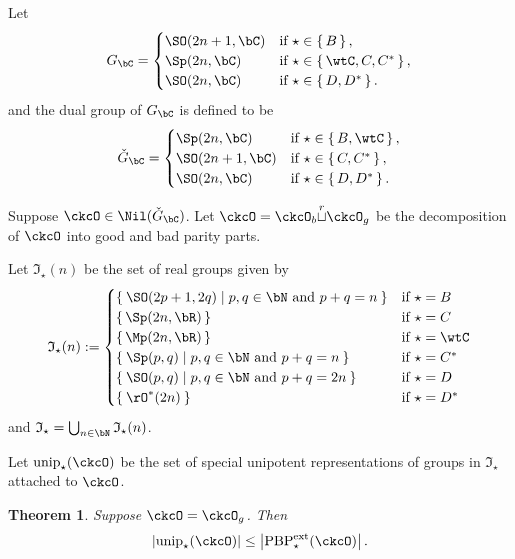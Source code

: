 \documentclass[12pt,a4paper]{amsart}
\def\abs#1{\left|{#1}\right|}
\numberwithin{equation}{section}
\newtheorem{thm}{Theorem}[section]
\theoremstyle{remark}
\def\unip{\mathrm{unip}}
\def\IC{\mathfrak{I}}
\def\ckG{\check{G}}
\def\ckGc{\check{G}_{\bC}}
\def\Gc{G_\bC}
\def\cuprow{{\stackrel{r}{\sqcup}}}
\def\PBPes{\mathrm{PBP}^{\mathrm{ext}}_{\star}}
\begin{document}
Let
\[
  \Gc =
  \begin{cases}
    \SO(2n+1,\bC) & \text{if } \star \in \set{B},\\
    \Sp(2n,\bC) & \text{if } \star \in \set{\wtC, C, C^{*}},\\
    \SO(2n,\bC) & \text{if } \star \in \set{D,D^{*}}.\\
  \end{cases}
\]
and the dual group of $\Gc$ is defined to be
\[
  \ckGc =
  \begin{cases}
    \Sp(2n,\bC) & \text{if } \star \in \set{B,\wtC},\\
    \SO(2n+1,\bC) & \text{if } \star \in \set{C, C^{*}},\\
    \SO(2n,\bC) & \text{if } \star \in \set{D,D^{*}}.\\
  \end{cases}
\]

Suppose $\ckcO\in \Nil(\ckG_{\bC})$.
Let $\ckcO = \ckcO_{b}\cuprow \ckcO_{g}$ be
the decomposition of $\ckcO$ into good and bad parity parts.

Let $\IC_{\star}(n)$ be the set of real groups given by
\[
  \IC_{\star}(n)
  :=
  \begin{cases}
    \Set{\SO(2p+1,2q)| p,q\in \bN \text{ and } p+q = n}
    & \text{if } \star = B\\
    \set{\Sp(2n,\bR)}
    & \text{if } \star = C\\
    \set{\Mp(2n,\bR)}
    & \text{if } \star = \wtC\\
    \Set{\Sp(p,q)| p,q\in \bN \text{ and } p+q = n}
    & \text{if } \star = C^{*}\\
    \Set{\SO(p,q)| p,q\in \bN \text{ and } p+q = 2n}
    & \text{if } \star = D\\
    \Set{\rO^{*}(2n)}
    & \text{if } \star = D^{*}\\
  \end{cases}
\]
and $\IC_{\star} = \bigcup_{n\in \bN} \IC_{\star}(n)$.

Let $ \unip_{\star}(\ckcO)$ be the set of special unipotent representations
of groups in $\IC_{\star}$ attached to $\ckcO$.


\begin{thm}
  Suppose $\ckcO = \ckcO_{g}$. Then
  \[
    \abs{\unip_{\star}(\ckcO)} \leq \abs{\PBPes(\ckcO)}.
  \]
\end{thm}
\end{document}
